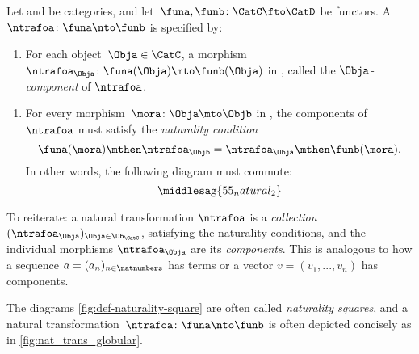 \begin{ctdefinition}
    \label{def:natural-transformation}
    Let \CatC and \CatD be categories, and let~$\funa,\funb\colon \CatC\fto \CatD$ be functors.
    A \emph{}~$\ntrafoa \colon \funa\nto \funb$ is specified by:

    \constit
    \begin{enumerate}
        \item For each object~$\Obja\in \CatC$, a morphism $\ntrafoa_\Obja \colon \funa(\Obja)\mto \funb(\Obja)$ in \CatD, called the $\Obja$\emph{-component} of $\ntrafoa$.
    \end{enumerate}
    \condit
    \begin{enumerate}
        \item For every morphism~$\mora\colon \Obja\mto \Objb$ in \CatC, the components of $\ntrafoa$ must satisfy the \emph{naturality condition}
              \begin{equation}
                  \funa(\mora)\mthen \ntrafoa_\Objb = \ntrafoa_\Obja\mthen \funb(\mora).
              \end{equation}
              In other words, the following diagram must commute:
              \begin{equation}\label{fig:def-naturality-square}
                  \middlesag{55_natural_2}
              \end{equation}
    \end{enumerate}
\end{ctdefinition}

To reiterate: a natural transformation $\ntrafoa$ is a \emph{collection} $(\ntrafoa_\Obja)_{\Obja \in \Ob_\CatC}$, satisfying the naturality conditions, and the individual morphisms $\ntrafoa_\Obja$ are its \emph{components}. This is analogous to how  a sequence $a = (a_n)_{n \in \natnumbers}$ has terms or a vector $v = (v_1, ... , v_n)$ has components. 

The diagrams \cref{fig:def-naturality-square} are often called \emph{naturality squares}, and a natural transformation~$\ntrafoa \colon \funa\nto \funb$ is often depicted concisely as in \cref{fig:nat_trans_globular}. 

\begin{marginfigure}
    \centering
    \caption{}
    \label{fig:nat_trans_globular}
\end{marginfigure}
\begin{figure}[h!]
    \centering
    \begin{ctdefinitionshade}
    \end{ctdefinitionshade}
    \caption{}
    \label{fig:nat_trans_graphically}
\end{figure}

